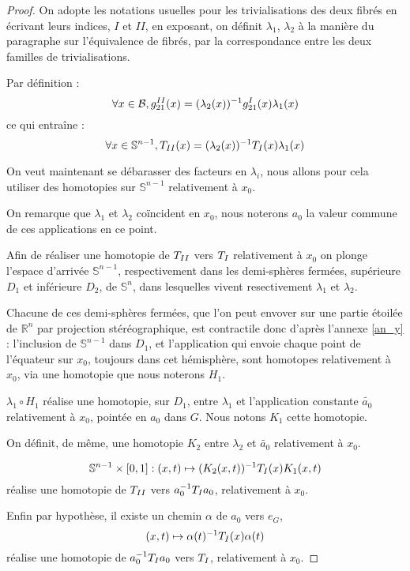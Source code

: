 
\begin{proof}
On adopte les notations usuelles pour les trivialisations des deux fibrés en écrivant leurs indices, $I$ et $II$, en exposant, %
on définit $\lambda_1$, $\lambda_2$ à la manière du paragraphe sur l'équivalence de fibrés, par la correspondance entre les deux familles de trivialisations.

\par
Par définition :
\[\forall x \in \mathcal{B} , g_{21}^{\Rom{2}}(x) = (\lambda_2(x))^{-1} g_{21}^{\Rom{1}}(x) \lambda_1(x)\]
ce qui entraîne :
\[\forall x \in \mathbb{S}^{n-1} , T_{\Rom{2}}(x) = (\lambda_2(x))^{-1} T_{\Rom{1}}(x) \lambda_1(x)\]

\etoile
On veut maintenant se débarasser des facteurs en $\lambda_i$, nous allons pour cela utiliser des homotopies sur $\mathbb{S}^{n-1}$ relativement à $x_0$.

\par
On remarque que $\lambda_1$ et $\lambda_2$ coïncident en $x_0$, nous noterons $a_0$ la valeur commune de ces applications en ce point.

\par
Afin de réaliser une homotopie de $T_{\Rom{2}}$ vers $T_{\Rom{1}}$ relativement à $x_0$ on plonge l'espace d'arrivée $\mathbb{S}^{n-1}$, %
respectivement dans les demi-sphères fermées, supérieure $D_1$ et inférieure $D_2$, de $\mathbb{S}^n$, %
dans lesquelles vivent resectivement $\lambda_1$ et $\lambda_2$.

\par
Chacune de ces demi-sphères fermées, que l'on peut envover sur une partie étoilée de $\mathbb{R}^n$ par projection stéréographique, %
est contractile donc d'après l'annexe \ref{an_y} : l'inclusion de $\mathbb{S}^{n-1}$ dans $D_1$, %
et l'application qui envoie chaque point de l'équateur sur $x_0$, toujours dans cet hémisphère, %
sont homotopes relativement à $x_0$, via une homotopie que nous noterons $H_1$.

\par
$\lambda_1 \circ H_1$ réalise une homotopie, sur $D_1$, entre $\lambda_1$ et l'application constante $\tilde{a_0}$ relativement à $x_0$, %
pointée en $a_0$ dans $G$. Nous notons $K_1$ cette homotopie.

\par
On définit, de même, une homotopie $K_2$ entre $\lambda_2$ et $\tilde{a_0}$ relativement à $x_0$.

\[\mathbb{S}^{n-1} \times [0,1] : (x,t) \mapsto (K_2(x,t))^{-1} T_{\Rom{1}}(x) K_1(x,t)\]
réalise une homotopie de $T_{\Rom{2}}$ vers $a_0^{-1} T_{\Rom{1}} a_0$, relativement à $x_0$.

\par
Enfin par hypothèse, il existe un chemin $\alpha$ de $a_0$ vers $e_G$,
\[(x,t) \mapsto \alpha(t)^{-1} T_{\Rom{1}}(x) \alpha(t)\]
réalise une homotopie de $a_0^{-1} T_{\Rom{1}} a_0$ vers $T_{\Rom{1}}$, relativement à $x_0$.
\end{proof}

